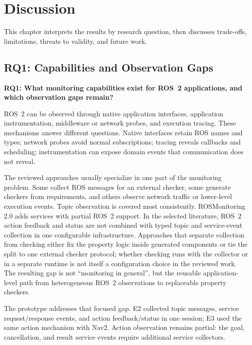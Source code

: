\chapter{Discussion}\label{chapter:discussion}

This chapter interprets the results by research question, then discusses
trade-offs, limitations, threats to validity, and future work.

\section{RQ1: Capabilities and Observation Gaps}

\textbf{RQ1: What monitoring capabilities exist for ROS~2 applications, and
which observation gaps remain?}

ROS~2 can be observed through native application interfaces,
application instrumentation, middleware or network probes, and execution
tracing. These mechanisms answer different questions. Native interfaces retain
ROS names and types; network probes avoid normal subscriptions; tracing reveals
callbacks and scheduling; instrumentation can expose domain events that
communication does not reveal.

The reviewed approaches usually specialize in one part of the monitoring
problem. Some collect ROS messages for an external checker, some generate
checkers from requirements, and others observe network traffic or lower-level
execution events. Topic observation is covered most consistently.
ROSMonitoring 2.0 adds services with partial ROS~2 support. In the selected
literature, ROS~2 action feedback and status are not combined with typed topic
and service-event collection in one configurable infrastructure. Approaches
that separate collection from checking either fix the property logic inside
generated components or tie the split to one external checker protocol;
whether checking runs with the collector or in a separate runtime is not
itself a configuration choice in the reviewed work. The resulting gap is
not ``monitoring in general'', but the reusable application-level
path from heterogeneous ROS~2 observations to replaceable property checkers.

The prototype addresses that focused gap. E2 collected topic messages, service
request/response events, and action feedback/status in one session; E3 used the
same action mechanism with Nav2. Action observation remains partial: the
goal, cancellation, and result service events require additional service
collectors.

